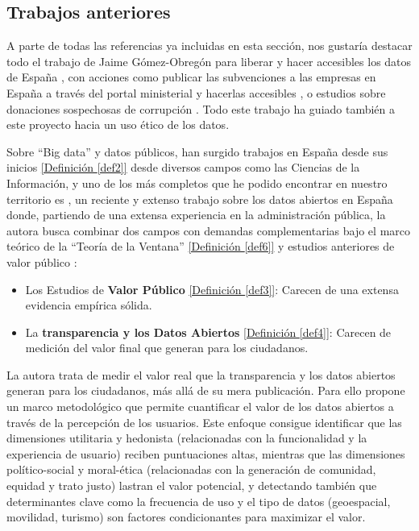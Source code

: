 \subsection{Trabajos anteriores}
	
	A parte de todas las referencias ya incluidas en esta sección, nos gustaría destacar todo el trabajo de Jaime Gómez-Obregón para liberar y hacer accesibles los datos de España \citep{JaimeGomezObregon}, con acciones como publicar las subvenciones a las empresas en España a través del portal ministerial y hacerlas accesibles \citep{JaimeGomezObregonSubvenciones}, o estudios sobre donaciones sospechosas de corrupción \citep{JaimeGomezObregonDonacion}. Todo este trabajo ha guiado también a este proyecto hacia un uso ético de los datos.
	
	Sobre ``Big data'' y datos públicos, han surgido trabajos en España desde sus inicios \citep{OperGovernment2011} \hyperref[def2]{[Definición \ref*{def2}]} desde diversos campos como las Ciencias de la Información, y uno de los más completos que he podido encontrar en nuestro territorio es \citep{HerreraCapriz2024}, un reciente y extenso trabajo sobre los datos abiertos en España donde, partiendo de una extensa experiencia en la administración pública, la autora busca combinar dos campos con demandas complementarias bajo el marco teórico de la ``Teoría de la Ventana'' \hyperref[def6]{[Definición \ref*{def6}]} y estudios anteriores de valor público \citep{Meynhardt19032009}:
	\begin{itemize}
		\item Los Estudios de \textbf{Valor Público} \hyperref[def3]{[Definición \ref*{def3}]}: Carecen de una extensa evidencia empírica sólida.
		\item La \textbf{transparencia y los Datos Abiertos} \hyperref[def4]{[Definición \ref*{def4}]}: Carecen de medición del valor final que generan para los ciudadanos.
	\end{itemize}
	
	La autora trata de medir el valor real que la transparencia y los datos abiertos generan para los ciudadanos, más allá de su mera publicación. Para ello propone un marco metodológico que permite cuantificar el valor de los datos abiertos a través de la percepción de los usuarios. Este enfoque consigue identificar que las dimensiones utilitaria y hedonista (relacionadas con la funcionalidad y la experiencia de usuario) reciben puntuaciones altas, mientras que las dimensiones político-social y moral-ética (relacionadas con la generación de comunidad, equidad y trato justo) lastran el valor potencial, y detectando también que determinantes clave como la frecuencia de uso y el tipo de datos (geoespacial, movilidad, turismo) son factores condicionantes para maximizar el valor.
	

